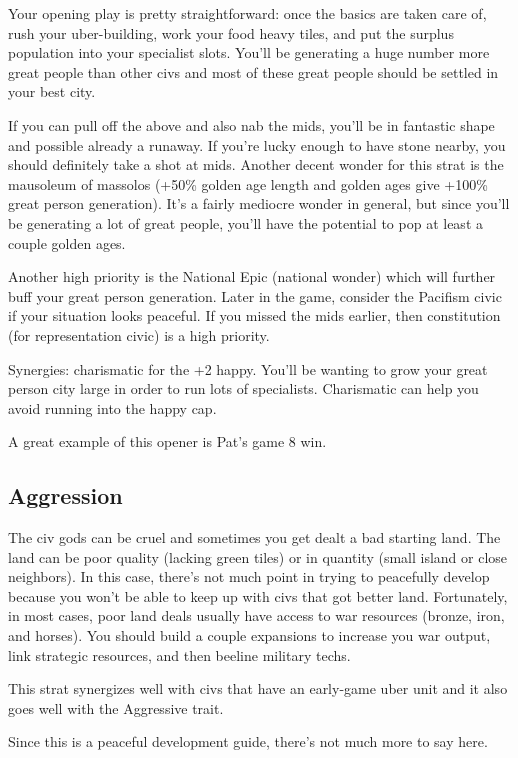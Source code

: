 \documentclass[10pt]{article}
\begin{document}
Your opening play is pretty straightforward: once the basics are taken
care of, rush your uber-building, work your food heavy tiles, and put
the surplus population into your specialist slots. You'll be
generating a huge number more great people than other civs and most of
these great people should be settled in your best city.

If you can pull off the above and also nab the mids, you'll be in
fantastic shape and possible already a runaway. If you're lucky enough
to have stone nearby, you should definitely take a shot at
mids. Another decent wonder for this strat is the mausoleum of massolos
(+50\% golden age length and golden ages give +100\% great person
generation). It's a fairly mediocre wonder in general, but since
you'll be generating a lot of great people, you'll have the potential
to pop at least a couple golden ages.

Another high priority is the National Epic (national wonder) which
will further buff your great person generation. Later in the game,
consider the Pacifism civic if your situation looks peaceful. If you
missed the mids earlier, then constitution (for representation civic)
is a high priority.

Synergies: charismatic for the +2 happy. You'll be wanting to grow
your great person city large in order to run lots of
specialists. Charismatic can help you avoid running into the happy
cap.

A great example of this opener is Pat's game 8 win.

\subsection*{Aggression}

The civ gods can be cruel and sometimes you get dealt a bad starting
land. The land can be poor quality (lacking green tiles) or in
quantity (small island or close neighbors). In this case, there's not
much point in trying to peacefully develop because you won't be
able to keep up with civs that got better land. Fortunately, in most
cases, poor land deals usually have access to war resources (bronze,
iron, and horses). You should build a couple expansions to increase
you war output, link strategic resources, and then beeline military
techs.

This strat synergizes well with civs that have an early-game uber unit
and it also goes well with the Aggressive trait.

Since this is a peaceful development guide, there's not much more to say here.
\end{document}
